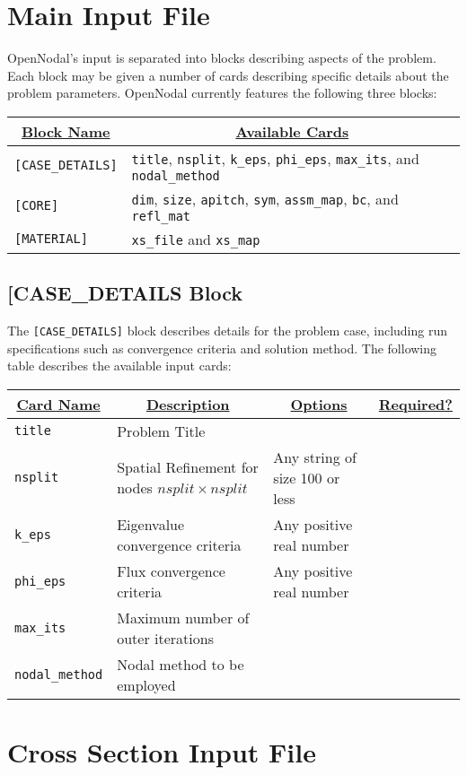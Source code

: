 \section{Main Input File}

OpenNodal's input is separated into blocks describing aspects of the problem.
Each block may be given a number of cards describing specific details about the problem parameters.
OpenNodal currently features the following three blocks:
\begin{table}[H]
\centering
  \begin{tabular}{|l|l|}
    \hline
    \multicolumn{1}{|c|}{{\ul \textbf{Block Name}}} & \multicolumn{1}{c|}{{\ul \textbf{Available Cards}}} \\ \hline
    \verb"[CASE_DETAILS]" & \verb"title", \verb"nsplit", \verb"k_eps", \verb"phi_eps", \verb"max_its", and \verb"nodal_method" \\ \hline
    \verb"[CORE]" & \verb"dim", \verb"size", \verb"apitch", \verb"sym", \verb"assm_map", \verb"bc", and \verb"refl_mat" \\ \hline
    \verb"[MATERIAL]" & \verb"xs_file" and \verb"xs_map" \\ \hline
  \end{tabular}
\end{table}

\subsection{[CASE\_DETAILS Block}

The \verb"[CASE_DETAILS]" block describes details for the problem case, including run specifications such as convergence criteria and solution method.
The following table describes the available input cards:
\begin{table}[H]
\centering
  \begin{tabular}{|l|l|l|l|}
    \hline
    \multicolumn{1}{|c|}{{\ul \textbf{Card Name}}} & \multicolumn{1}{c|}{{\ul \textbf{Description}}} & \multicolumn{1}{c|}{{\ul \textbf{Options}}} & \multicolumn{1}{c|}{{\ul \textbf{Required?}}} \\ \hline
    \verb"title"  & Problem Title & & \\ \hline
    \verb"nsplit" & Spatial Refinement for nodes $nsplit\times nsplit$ & Any string of size 100 or less & \\ \hline
    \verb"k_eps" & Eigenvalue convergence criteria & Any positive real number & \\ \hline
    \verb"phi_eps" & Flux convergence criteria & Any positive real number & \\ \hline
    \verb"max_its" & Maximum number of outer iterations & & \\ \hline
    \verb"nodal_method" & Nodal method to be employed & & \\ \hline
  \end{tabular}
\end{table}

\section{Cross Section Input File}